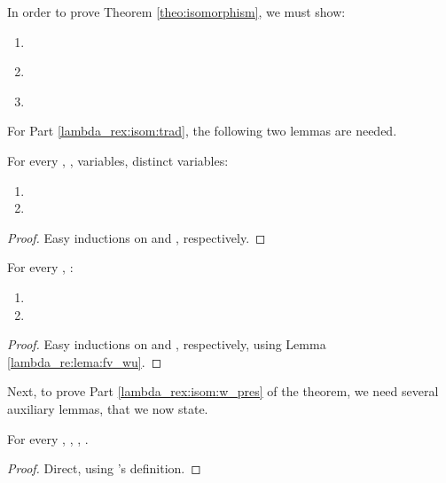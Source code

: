 \label{apx:isomorphisms}

In order to prove Theorem \ref{theo:isomorphism}, we must show:

\begin{enumerate}[\hspace{.4cm} A.]
    \item \label{lambda_rex:isom:trad} 
    \item \label{lambda_rex:isom:w_pres} 
    \item \label{lambda_rex:isom:u_pres} 
\end{enumerate}

For Part \ref{lambda_rex:isom:trad}, the following two lemmas are needed.

\begin{lemma}\label{lambda_re:lema:fv_wu} 
For every , ,  variables,  distinct variables:
\begin{enumerate}
    \item 
    \item 
\end{enumerate}
    \begin{proof}
    \vspace{-.07cm}
    Easy inductions on  and , respectively.
    \end{proof}
\end{lemma}

\begin{lemma}\label{lambda_re:lema:comp} 
For every , : 
\begin{enumerate}
    \item 
    \item 
\end{enumerate}
\vspace{-.3cm}
    \begin{proof}
    Easy inductions on  and , respectively, using Lemma \ref{lambda_re:lema:fv_wu}.
    \end{proof}
\end{lemma}

Next, to prove Part \ref{lambda_rex:isom:w_pres} of the theorem, we need
several auxiliary lemmas, that we now state.

\begin{lemma}\label{lambda_re:lema:w_variable_no_primera_en_lista}
For every , , ,
.
    \begin{proof}
    \vspace{-.07cm}
    Direct, using 's definition.
    \end{proof}
\end{lemma}

